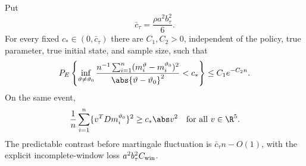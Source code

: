 \begin{proposition}
\label{prop:balanced-contrast}
Put
\[
 \bar c_\tau=\frac{\rho a^2b_\tau^2}{6}.
\]
For every fixed \(c_*\in(0,\bar c_\tau)\) there are
\(C_1,C_2>0\), independent of the policy, true parameter, true initial state,
and sample size, such that
\begin{equation}
 P_E\left\{
 \inf_{\vartheta\ne\vartheta_0}
 \frac{n^{-1}\sum_{i=1}^n
 (m_i^\vartheta-m_i^{\vartheta_0})^2}
      {\abs{\vartheta-\vartheta_0}^2}<c_*
 \right\}\le C_1e^{-C_2n}.
 \label{eq:full-empirical-contrast}
\end{equation}
On the same event,
\[
 \frac1n\sum_{i=1}^n
 \{v^TDm_i^{\vartheta_0}\}^2\ge c_*\abs v^2
 \quad\hbox{for all }v\in\R^5.
\]
The predictable contrast before martingale fluctuation is
\(\bar c_\tau n-O(1)\), with the explicit incomplete-window loss
\(a^2b_\tau^2C_{\rm win}\).
\end{proposition}

